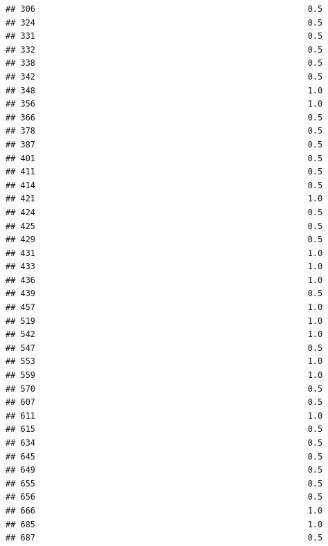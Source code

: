\documentclass[
]{article}
\begin{document}
\begin{verbatim}
## 306                                                       0.5
## 324                                                       0.5
## 331                                                       0.5
## 332                                                       0.5
## 338                                                       0.5
## 342                                                       0.5
## 348                                                       1.0
## 356                                                       1.0
## 366                                                       0.5
## 378                                                       0.5
## 387                                                       0.5
## 401                                                       0.5
## 411                                                       0.5
## 414                                                       0.5
## 421                                                       1.0
## 424                                                       0.5
## 425                                                       0.5
## 429                                                       0.5
## 431                                                       1.0
## 433                                                       1.0
## 436                                                       1.0
## 439                                                       0.5
## 457                                                       1.0
## 519                                                       1.0
## 542                                                       1.0
## 547                                                       0.5
## 553                                                       1.0
## 559                                                       1.0
## 570                                                       0.5
## 607                                                       0.5
## 611                                                       1.0
## 615                                                       0.5
## 634                                                       0.5
## 645                                                       0.5
## 649                                                       0.5
## 655                                                       0.5
## 656                                                       0.5
## 666                                                       1.0
## 685                                                       1.0
## 687                                                       0.5

\end{verbatim}
\end{document}
